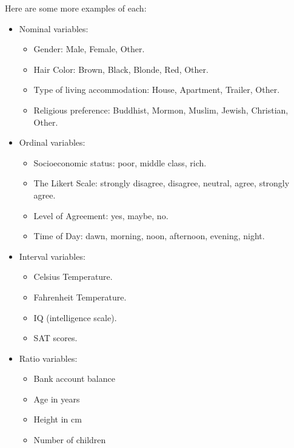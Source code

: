 \documentclass[]{book}
\providecommand{\tightlist}{%
  \setlength{\itemsep}{0pt}\setlength{\parskip}{0pt}}
\theoremstyle{definition}
\theoremstyle{definition}
\theoremstyle{definition}
\theoremstyle{remark}
\begin{document}
Here are some more examples of each:

\begin{itemize}
\tightlist
\item
  Nominal variables:

  \begin{itemize}
  \tightlist
  \item
    Gender: Male, Female, Other.
  \item
    Hair Color: Brown, Black, Blonde, Red, Other.
  \item
    Type of living accommodation: House, Apartment, Trailer, Other.
  \item
    Religious preference: Buddhist, Mormon, Muslim, Jewish, Christian,
    Other.
  \end{itemize}
\item
  Ordinal variables:

  \begin{itemize}
  \tightlist
  \item
    Socioeconomic status: poor, middle class, rich.
  \item
    The Likert Scale: strongly disagree, disagree, neutral, agree,
    strongly agree.
  \item
    Level of Agreement: yes, maybe, no.
  \item
    Time of Day: dawn, morning, noon, afternoon, evening, night.
  \end{itemize}
\item
  Interval variables:

  \begin{itemize}
  \tightlist
  \item
    Celsius Temperature.
  \item
    Fahrenheit Temperature.
  \item
    IQ (intelligence scale).
  \item
    SAT scores.
  \end{itemize}
\item
  Ratio variables:

  \begin{itemize}
  \tightlist
  \item
    Bank account balance
  \item
    Age in years
  \item
    Height in cm
  \item
    Number of children
  \end{itemize}
\end{itemize}
\end{document}
